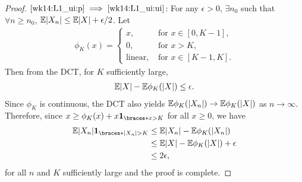 \documentclass[12pt]{article}
\begin{document}
\begin{proof}
$\ref{wk14:L1_ui:p} \implies \ref{wk14:L1_ui:ui}$: For any $\epsilon>0$, $\exists n_0$ such that $\forall n\geq n_0$, $\E|X_n| \leq \E|X|+\epsilon/2$. Let 
\begin{align*}
\phi_K(x) = \left\{
	\begin{array}{ll}
		x, & \text{ for $x\in[0,K-1]$}, \\
		0, & \text{ for $x> K$}, \\
		\text{linear}, & \text{ for $x\in[K-1,K]$}. 
	\end{array}
\right.
\end{align*}
Then from the DCT, for $K$ sufficiently large,
\begin{align*}
\E|X| - \E\phi_K(|X|) \leq \epsilon.
\end{align*}
Since $\phi_K$ is continuous, the DCT also yields $\E\phi_K(|X_n|) \to \E\phi_K(|X|)$ as $n\to\infty$. Therefore, since $x \geq \phi_K(x) + x\indicator{x>K}$ for all $x\geq0$, we have
\begin{align*}
\E|X_n|\indicator{|X_n|>K} 
&\leq \E|X_n| - \E\phi_K(|X_n|)\\
&\leq \E|X| - \E\phi_K(|X|) + \epsilon\\
&\leq 2\epsilon,
\end{align*}
for all $n$ and $K$ sufficiently large and the proof is complete.
\end{proof}


%

\end{document}
